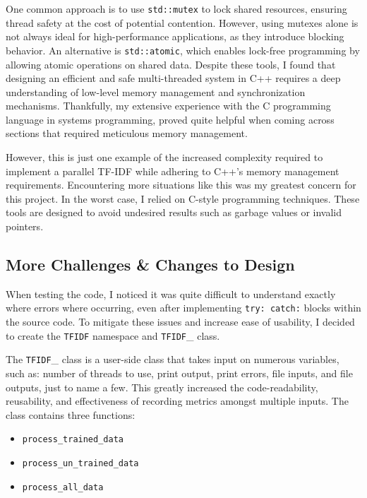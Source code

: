\documentclass[conference]{IEEEtran}
\newcommand{\code}[1]{\lstinline[basicstyle=\ttfamily]|#1|}
\begin{document}
One common approach is to use \code{std::mutex} to lock shared resources, ensuring thread safety at the cost of potential contention. However, using mutexes alone is not always ideal for high-performance applications, as they introduce blocking behavior. An alternative is \code{std::atomic}, which enables lock-free programming by allowing atomic operations on shared data. Despite these tools, I found that designing an efficient and safe multi-threaded system in C++ requires a deep understanding of low-level memory management and synchronization mechanisms. Thankfully, my extensive experience with the C programming language in systems programming, proved quite helpful when coming across sections that required meticulous memory management.

However, this is just one example of the increased complexity required to implement a parallel TF-IDF while adhering to C++’s memory management requirements. Encountering more situations like this was my greatest concern for this project. In the worst case, I relied on C-style programming techniques. These tools are designed to avoid undesired results such as garbage values or invalid pointers.

\subsection{More Challenges \& Changes to Design}
When testing the code, I noticed it was quite difficult to understand exactly where errors where occurring, even after implementing \code{try: catch:} blocks within the source code. To mitigate these issues and increase ease of usability, I decided to create the \code{TFIDF} namespace and \code{TFIDF}\_ class.

The \code{TFIDF}\_ class is a user-side class that takes input on numerous variables, such as: number of threads to use, print output, print errors, file inputs, and file outputs, just to name a few. This greatly increased the code-readability, reusability, and effectiveness of recording metrics amongst multiple inputs. The class contains three functions:
\begin{itemize}
    \item \code{process_trained_data} %
    \item \code{process_un_trained_data}%
    \item \code{process_all_data}%
\end{itemize}
\end{document}
